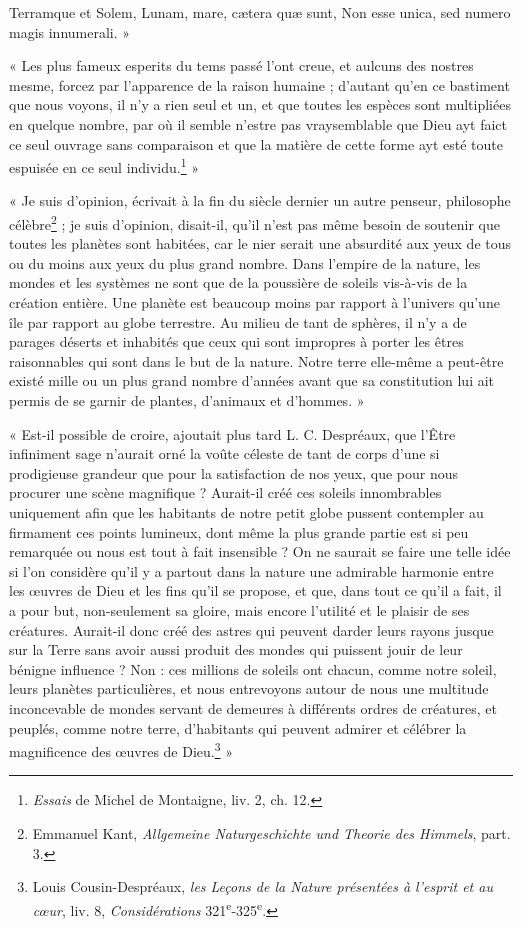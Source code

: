 \documentclass[a4paper, 11pt, oneside]{article}
\begin{document}
Terramque et Solem, Lunam, mare, cætera quæ sunt,  
Non esse unica, sed numero magis innumerali. »

« Les plus fameux esperits du tems passé l'ont creue, et aulcuns des nostres mesme, forcez par l'apparence de la raison humaine ; d'autant qu'en ce bastiment que nous voyons, il n'y a rien seul et un, et que toutes les espèces sont multipliées en quelque nombre, par où il semble n'estre pas vraysemblable que Dieu ayt faict ce seul ouvrage sans comparaison et que la matière de cette forme ayt esté toute espuisée en ce seul individu.\footnote{\emph{Essais} de Michel de Montaigne, liv. 2, ch. 12.} »

« Je suis d'opinion, écrivait à la fin du siècle dernier un autre penseur, philosophe célèbre\footnote{Emmanuel Kant, \emph{Allgemeine Naturgeschichte und Theorie des Himmels}, part. 3.} ; je suis d'opinion, disait-il, qu'il n'est pas même besoin de soutenir que toutes les planètes sont habitées, car le nier serait une absurdité aux yeux de tous ou du moins aux yeux du plus grand nombre. Dans l'empire de la nature, les mondes et les systèmes ne sont que de la poussière de soleils vis-à-vis de la création entière. Une planète est beaucoup moins par rapport à l'univers qu'une île par rapport au globe terrestre. Au milieu de tant de sphères, il n'y a de parages déserts et inhabités que ceux qui sont impropres à porter les êtres raisonnables qui sont dans le but de la nature. Notre terre elle-même a peut-être existé mille ou un plus grand nombre d'années avant que sa constitution lui ait permis de se garnir de plantes, d'animaux et d'hommes. »

« Est-il possible de croire, ajoutait plus tard L. C. Despréaux, que l'Être infiniment sage n'aurait orné la voûte céleste de tant de corps d'une si prodigieuse grandeur que pour la satisfaction de nos yeux, que pour nous procurer une scène magnifique ? Aurait-il créé ces soleils innombrables uniquement afin que les habitants de notre petit globe pussent contempler au firmament ces points lumineux, dont même la plus grande partie est si peu remarquée ou nous est tout à fait insensible ? On ne saurait se faire une telle idée si l'on considère qu'il y a partout dans la nature une admirable harmonie entre les œuvres de Dieu et les fins qu'il se propose, et que, dans tout ce qu'il a fait, il a pour but, non-seulement sa gloire, mais encore l'utilité et le plaisir de ses créatures. Aurait-il donc créé des astres qui peuvent darder leurs rayons jusque sur la Terre sans avoir aussi produit des mondes qui puissent jouir de leur bénigne influence ? Non : ces millions de soleils ont chacun, comme notre soleil, leurs planètes particulières, et nous entrevoyons autour de nous une multitude inconcevable de mondes servant de demeures à différents ordres de créatures, et peuplés, comme notre terre, d'habitants qui peuvent admirer et célébrer la magnificence des œuvres de Dieu.\footnote{Louis Cousin-Despréaux, \emph{les Leçons de la Nature présentées à l'esprit et au cœur}, liv. 8, \emph{Considérations} 321\textsuperscript{e}-325\textsuperscript{e}.} »
\end{document}
